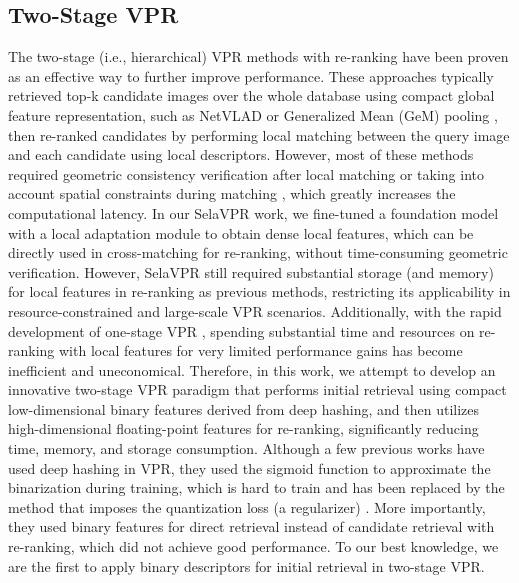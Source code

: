 \subsection{Two-Stage VPR}
\label{sec:2stagevpr}
The two-stage (i.e., hierarchical) VPR methods with re-ranking \cite{hvpr,seqnet,patchvlad,geowarp,tcl,transvpr,aanet,structvpr,r2former,selavpr,dhevpr} have been proven as an effective way to further improve performance. These approaches typically retrieved top-k candidate images over the whole database using compact global feature representation, such as NetVLAD \cite{netvlad} or Generalized Mean (GeM) pooling \cite{gem}, then re-ranked candidates by performing local matching between the query image and each candidate using local descriptors. However, most of these methods required geometric consistency verification after local matching \cite{delg,patchvlad,transvpr,dhevpr} or taking into account spatial constraints during matching \cite{geowarp,aanet,r2former}, which greatly increases the computational latency. In our SelaVPR \cite{selavpr} work, we fine-tuned a foundation model with a local adaptation module to obtain dense local features, which can be directly used in cross-matching for re-ranking, without time-consuming geometric verification. However, SelaVPR still required substantial storage (and memory) for local features in re-ranking as previous methods, restricting its applicability in resource-constrained and large-scale VPR scenarios. Additionally, with the rapid development of one-stage VPR \cite{cricavpr,salad,boq}, spending substantial time and resources on re-ranking with local features for very limited performance gains has become inefficient and uneconomical. Therefore, in this work, we attempt to develop an innovative two-stage VPR paradigm that performs initial retrieval using compact low-dimensional binary features derived from deep hashing, and then utilizes high-dimensional floating-point features for re-ranking, significantly reducing time, memory, and storage consumption. Although a few previous works \cite{hashingforVPR1,hashingforVPR2} have used deep hashing in VPR, they used the sigmoid function to approximate the binarization during training, which is hard to train and has been replaced by the method that imposes the quantization loss (a regularizer) \cite{hashing2016}. More importantly, they used binary features for direct retrieval instead of candidate retrieval with re-ranking, which did not achieve good performance. To our best knowledge, we are the first to apply binary descriptors for initial retrieval in two-stage VPR.

